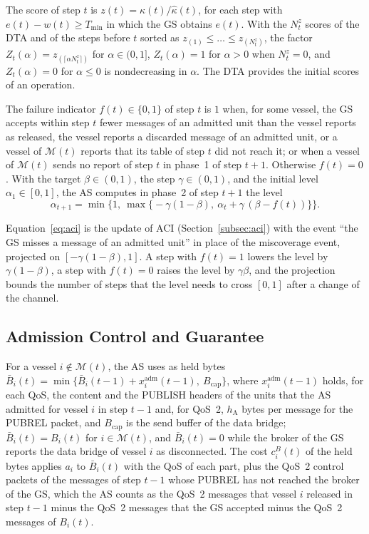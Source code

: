 The score of step $t$ is $z(t) = \kappa(t)/\hat{\kappa}(t)$, for each step with $e(t) - w(t) \geq T_{\min}$ in which the GS obtains $e(t)$. With the $N^z_t$ scores of the DTA and of the steps before $t$ sorted as $z_{(1)} \leq \dots \leq z_{(N^z_t)}$, the factor $Z_t(\alpha) = z_{(\lceil \alpha N^z_t \rceil)}$ for $\alpha \in (0, 1]$, $Z_t(\alpha) = 1$ for $\alpha > 0$ when $N^z_t = 0$, and $Z_t(\alpha) = 0$ for $\alpha \leq 0$ is nondecreasing in $\alpha$. The DTA provides the initial scores of an operation.

\begin{definition}\label{def:aci}
The failure indicator $f(t) \in \{0, 1\}$ of step $t$ is $1$ when, for some vessel, the GS accepts within step $t$ fewer messages of an admitted unit than the vessel reports as released, the vessel reports a discarded message of an admitted unit, or a vessel of $\mathcal{M}(t)$ reports that its table of step $t$ did not reach it; or when a vessel of $\mathcal{M}(t)$ sends no report of step $t$ in phase~1 of step $t+1$. Otherwise $f(t) = 0$. With the target $\beta \in (0, 1)$, the step $\gamma \in (0, 1)$, and the initial level $\alpha_1 \in [0, 1]$, the AS computes in phase~2 of step $t+1$ the level
\begin{equation}
\alpha_{t+1} = \min\Big\{1,\ \max\big\{-\gamma(1 - \beta),\ \alpha_t + \gamma\,(\beta - f(t))\big\}\Big\}.
\label{eq:aci}
\end{equation}
\end{definition}

Equation~\eqref{eq:aci} is the update of ACI (Section~\ref{subsec:aci}) with the event ``the GS misses a message of an admitted unit'' in place of the miscoverage event, projected on $[-\gamma(1-\beta), 1]$. A step with $f(t) = 1$ lowers the level by $\gamma(1 - \beta)$, a step with $f(t) = 0$ raises the level by $\gamma\beta$, and the projection bounds the number of steps that the level needs to cross $[0, 1]$ after a change of the channel.

\subsection{Admission Control and Guarantee}\label{subsec:admission}

For a vessel $i \notin \mathcal{M}(t)$, the AS uses as held bytes $\bar{B}_i(t) = \min\{\bar{B}_i(t-1) + x^{\mathrm{adm}}_i(t-1),\ B_{\mathrm{cap}}\}$, where $x^{\mathrm{adm}}_i(t-1)$ holds, for each QoS, the content and the PUBLISH headers of the units that the AS admitted for vessel $i$ in step $t-1$ and, for QoS~2, $h_{\mathrm{A}}$ bytes per message for the PUBREL packet, and $B_{\mathrm{cap}}$ is the send buffer of the data bridge; $\bar{B}_i(t) = B_i(t)$ for $i \in \mathcal{M}(t)$, and $\bar{B}_i(t) = 0$ while the broker of the GS reports the data bridge of vessel $i$ as disconnected. The cost $c^B_i(t)$ of the held bytes applies $a_i$ to $\bar{B}_i(t)$ with the QoS of each part, plus the QoS~2 control packets of the messages of step $t-1$ whose PUBREL has not reached the broker of the GS, which the AS counts as the QoS~2 messages that vessel $i$ released in step $t-1$ minus the QoS~2 messages that the GS accepted minus the QoS~2 messages of $B_i(t)$.

